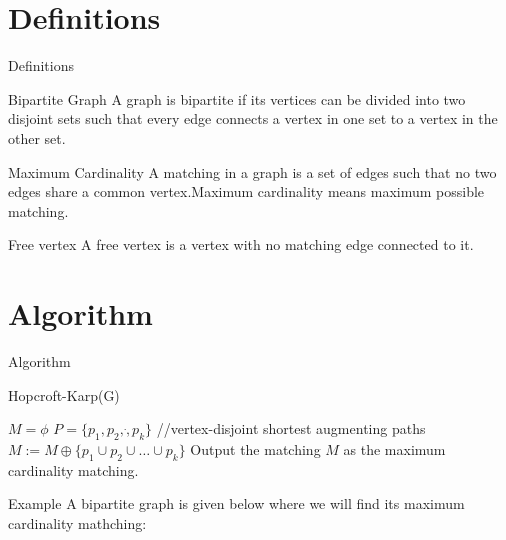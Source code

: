 \documentclass{beamer}
\begin{document}
\section{Definitions}
\begin{frame}{Definitions}
     \begin{block}{Bipartite Graph}
A graph is bipartite if its vertices can be divided into two disjoint sets such that every edge connects a vertex in one set to a vertex in the other set.
\end{block}
 \pause
\begin{block}{Maximum Cardinality}
A matching in a graph is a set of edges such that no two edges share a common vertex.Maximum cardinality means maximum possible matching.
\end{block} \pause
\begin{block}{Free vertex}
 A free vertex is a vertex with no matching edge connected to it.
\end{block}


\end{frame}

\section{Algorithm}
\begin{frame}{Algorithm}
\renewcommand{\thealgorithm}{}
\begin{algorithm}[H]
\caption{Hopcroft-Karp(G)}
\begin{algorithmic}[1]
\State $M=\phi$ \pause
{} \pause
\State $P=\{p_1,p_2,\dot,p_k\}$ {\small //vertex-disjoint shortest augmenting paths} \pause
\State $M:=M\oplus\{p_1 \cup p_2 \cup \dots \cup p_k\}$\pause
\EndWhile
\State Output the matching $M$ as the maximum cardinality matching.
\end{algorithmic}
\end{algorithm}
\end{frame}

\begin{frame}{Example}
A bipartite graph is given below where we will find its maximum cardinality mathching:\\
 \vspace{.5cm}
    \centering
{}
\end{frame}
\end{document}
